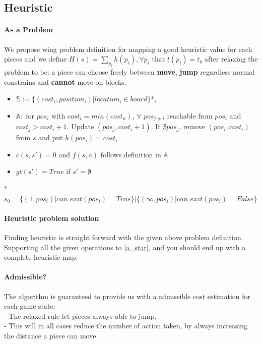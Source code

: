 \documentclass[11pt,a4paper]{article}
\begin{document}
    \subsection{Heuristic}
        \paragraph{As a Problem} We propose wing problem definition for mapping a good heuristic value for each pieces and we define $H(s) = \sum_{p_i}h(p_i), \forall p_i$ that $t(p_i) = t_b$ after relaxing the problem to be: a piece can choose freely between \textbf{move}, \textbf{jump} regardless normal constrains and \textbf{cannot} move on blocks.
        \begin{itemize}
            \itemsep0em   
            \item $\mathbb{S} := \{(cost_i, position_i)|location_i\in board\}$*,
            \item $\mathbb{A} :$ for $pos_i$ with $cost_i=min({cost_n})$, $\forall$ $pos_{j\ne i} $ reachable from $pos_i$ and $cost_j > cost_i+1$. Update $(pos_j, cost_i + 1)$. If $\nexists pos_j$, remove $(pos_i, cost_i)$ from $s$ and put $h(pos_i) = cost_i$
            \item $c(s, s')=0$ and $f(s,a)$ follows definition in $\mathbb{A}$
            \item $gt(s')=True$ if $s' = \emptyset$
        \end{itemize}
        *$s_0 = \{(1, pos_i)|can\_exit(pos_i) = True\} | \{(\infty, pos_i)|can\_exit(pos_i) = False\}$
        \vspace{-10pt}
        \paragraph{Heuristic problem solution} Finding heuristic is straight forward with the given above problem definition. Supporting all the given operations to \ref{a_star}, and you should end up with a complete heuristic map.
        \vspace{-10pt}
        \paragraph{Admissible?} The algorithm is guaranteed to provide us with a admissible cost estimation for each game state:\\
    - The relaxed rule let pieces always able to jump.\\
    - This will in all cases reduce the number of action taken, by always increasing the distance a piece can move.
    \vspace{-10pt}
\end{document}
